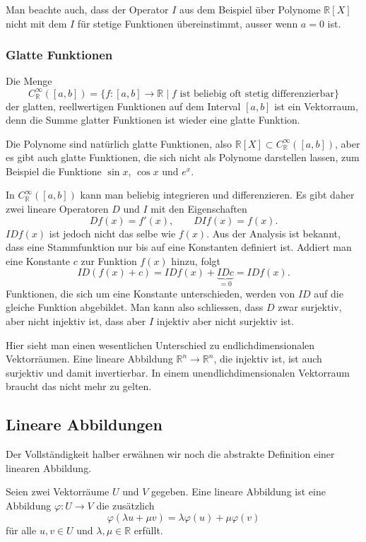 Man beachte auch, dass der Operator $I$ aus dem Beispiel über Polynome
$\mathbb R[X]$ nicht mit dem $I$ für stetige Funktionen übereinstimmt,
ausser wenn $a=0$ ist.

\subsubsection{Glatte Funktionen}
Die Menge
\[
C^{\infty}_{\mathbb R}([a,b])
=
\{ f\colon [a,b]\to\mathbb R\;|\;
\text{$f$ ist beliebig oft stetig differenzierbar}\}
\]
der glatten, reellwertigen Funktionen auf dem Interval $[a,b]$
ist ein Vektorraum, denn die Summe glatter Funktionen ist wieder
eine glatte Funktion.

Die Polynome sind natürlich glatte Funktionen, also
$\mathbb R[X]\subset C^{\infty}_{\mathbb R}([a,b])$,
aber es gibt auch glatte Funktionen, die sich nicht als Polynome
darstellen lassen, zum Beispiel die Funktione
$\sin x$, $\cos x$ und $e^x$.

In $C^{\infty}_{\mathbb R}([a,b])$ kann man beliebig integrieren und
differenzieren.
Es gibt daher zwei lineare Operatoren $D$ und $I$ mit den Eigenschaften
\[
Df(x) = f'(x),
\qquad
DIf(x) = f(x).
\]
$IDf(x)$ ist jedoch nicht das selbe wie $f(x)$.
Aus der Analysis ist bekannt, dass eine Stammfunktion nur bis auf
eine Konstanten definiert ist.
Addiert man eine Konstante $c$ zur Funktion $f(x)$ hinzu, folgt
\[
ID(f(x)+c) = IDf(x) + \underbrace{IDc}_{=0} =  IDf(x).
\]
Funktionen, die sich um eine Konstante unterschieden, werden von $ID$ auf
die gleiche Funktion abgebildet.
Man kann also schliessen, dass $D$ zwar surjektiv, aber nicht injektiv ist,
dass aber $I$ injektiv aber nicht surjektiv ist.

Hier sieht man einen wesentlichen Unterschied zu endlichdimensionalen
Vektorräumen.
Eine lineare Abbildung $\mathbb R^n\to\mathbb R^n$, die injektiv ist, ist
auch surjektiv und damit invertierbar.
In einem unendlichdimensionalen Vektorraum braucht das nicht mehr zu
gelten.


%
%
\subsection{Lineare Abbildungen}
Der Vollständigkeit halber erwähnen wir noch die abstrakte Definition
einer linearen Abbildung.

\begin{definition}
Seien zwei Vektorräume $U$ und $V$ gegeben.
Eine lineare Abbildung ist eine Abbildung
$\varphi\colon U\to V$ die zusätzlich
\begin{equation}
\varphi(\lambda u+\mu v) = \lambda \varphi(u) + \mu \varphi(v)
\label{skript:linabb:def:linkomb}
\end{equation}
für alle $u,v\in U$ und $\lambda,\mu\in\mathbb R$ erfüllt.
\end{definition}

